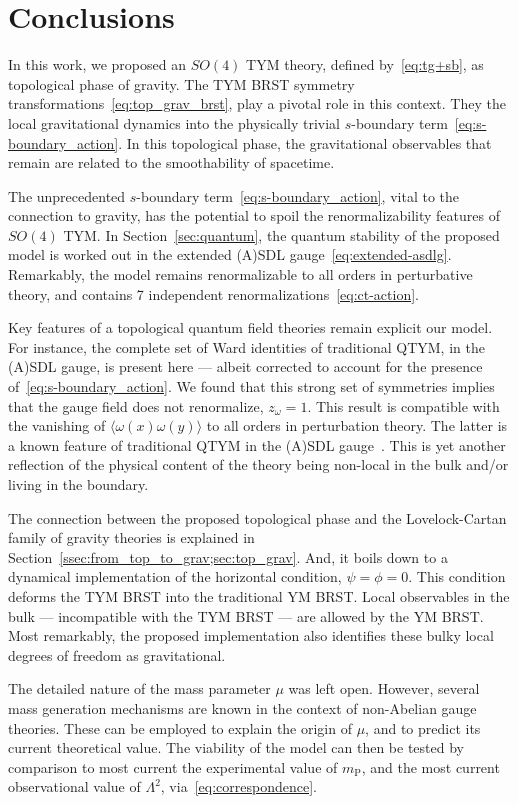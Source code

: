 \documentclass[../main.tex]{subfiles}
\begin{document}
\section{Conclusions}%
\label{sec:conclusions}

In this work, we proposed an $ SO \left( 4 \right) $ TYM theory, defined by~\eqref{eq:tg+sb}, as topological phase of gravity. The TYM BRST symmetry transformations~\eqref{eq:top_grav_brst}, play a pivotal role in this context. They  the local gravitational dynamics into the physically trivial $s$-boundary term~\eqref{eq:s-boundary_action}. In this topological phase, the gravitational observables that remain are related to the smoothability of spacetime.

The unprecedented $ s $-boundary term~\eqref{eq:s-boundary_action}, vital to the connection to gravity, has the potential to spoil the renormalizability features of $ SO(4) $ TYM\@. In Section~\ref{sec:quantum}, the quantum stability of the proposed model is worked out in the extended (A)SDL gauge~\eqref{eq:extended-asdlg}. Remarkably, the model remains renormalizable to all orders in perturbative theory, and contains 7 independent renormalizations~\eqref{eq:ct-action}.

Key features of a topological quantum field theories remain explicit our model. For instance, the complete set of Ward identities of traditional QTYM, in the (A)SDL gauge, is present here --- albeit corrected to account for the presence of~\eqref{eq:s-boundary_action}. We found that this strong set of symmetries implies that the gauge field does not renormalize, $ z_{ \omega } = 1 $. This result is compatible with the vanishing of $ \langle \omega(x) \omega(y) \rangle $ to all orders in perturbation theory. The latter is a known feature of traditional QTYM in the (A)SDL gauge~\cite{sadovski2017c,sadovski2018a}. This is yet another reflection of the physical content of the theory being non-local in the bulk and/or living in the boundary.

The connection between the proposed topological phase and the Lovelock-Cartan family of gravity theories is explained in Section~\ref{ssec:from_top_to_grav;sec:top_grav}. And, it boils down to a dynamical implementation of the horizontal condition, $ \psi = \phi = 0 $. This condition deforms the TYM BRST into the traditional YM BRST\@. Local observables in the bulk --- incompatible with the TYM BRST --- are allowed by the YM BRST\@. Most remarkably, the proposed implementation also identifies these bulky local degrees of freedom as gravitational.

The detailed nature of the mass parameter $ \mu $ was left open. However, several mass generation mechanisms are known in the context of non-Abelian gauge theories. These can be employed to explain the origin of $ \mu $, and to predict its current theoretical value. The viability of the model can then be tested by comparison to most current the experimental value of $ m_{ \text{P} } $, and the most current observational value of $ \Lambda^2 $, via~\eqref{eq:correspondence}.
\end{document}
